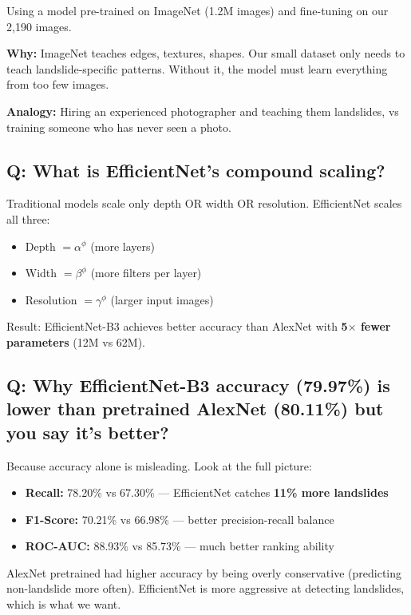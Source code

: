 \documentclass[11pt]{article}
\begin{document}
Using a model pre-trained on ImageNet (1.2M images) and fine-tuning on our 2,190 images.

\textbf{Why:} ImageNet teaches edges, textures, shapes. Our small dataset only needs to teach landslide-specific patterns. Without it, the model must learn everything from too few images.

\textbf{Analogy:} Hiring an experienced photographer and teaching them landslides, vs training someone who has never seen a photo.

\subsection{Q: What is EfficientNet's compound scaling?}

Traditional models scale only depth OR width OR resolution. EfficientNet scales all three:
\begin{itemize}[noitemsep]
    \item Depth $= \alpha^\phi$ (more layers)
    \item Width $= \beta^\phi$ (more filters per layer)
    \item Resolution $= \gamma^\phi$ (larger input images)
\end{itemize}

Result: EfficientNet-B3 achieves better accuracy than AlexNet with \textbf{5$\times$ fewer parameters} (12M vs 62M).

\subsection{Q: Why EfficientNet-B3 accuracy (79.97\%) is lower than pretrained AlexNet (80.11\%) but you say it's better?}

Because accuracy alone is misleading. Look at the full picture:
\begin{itemize}[noitemsep]
    \item \textbf{Recall:} 78.20\% vs 67.30\% --- EfficientNet catches \textbf{11\% more landslides}
    \item \textbf{F1-Score:} 70.21\% vs 66.98\% --- better precision-recall balance
    \item \textbf{ROC-AUC:} 88.93\% vs 85.73\% --- much better ranking ability
\end{itemize}

AlexNet pretrained had higher accuracy by being overly conservative (predicting non-landslide more often). EfficientNet is more aggressive at detecting landslides, which is what we want.
\end{document}
